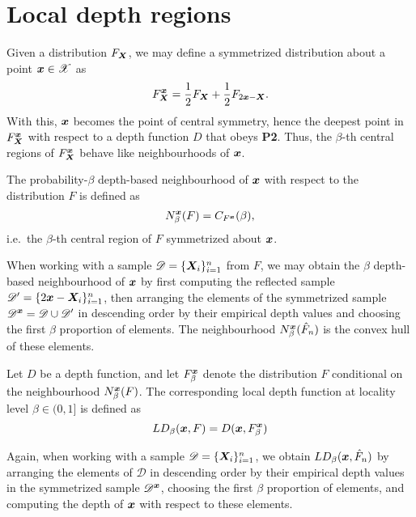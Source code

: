 

\section{Local depth regions}

Given a distribution $F_{\bm{X}}$, we may define a symmetrized distribution about
a point $\bm{x} \in \mathscr{X}$ as
\begin{equation}
    F^{\bm{x}}_{\bm{X}} = \frac{1}{2}F_{\bm{X}} + \frac{1}{2}F_{2\bm{x} - \bm{X}}. \label{eq:local_symmetrization}
\end{equation}
With this, $\bm{x}$ becomes the point of central symmetry, hence the deepest
point in $F^{\bm{x}}_{\bm{X}}$ with respect to a depth function $D$ that obeys
\textbf{P2}.
Thus, the $\beta$-th central regions of $F^{\bm{x}}_{\bm{X}}$ behave like
neighbourhoods of $\bm{x}$.

\begin{definition}
    The probability-$\beta$ depth-based neighbourhood of $\bm{x}$ with respect to
    the distribution $F$ is defined as
    \begin{equation}
        N^{\bm{x}}_\beta(F) = C_{F^{\bm{x}}}(\beta),
    \end{equation}
    i.e.\ the $\beta$-th central region of $F$ symmetrized about $\bm{x}$.
\end{definition}

When working with a sample $\mathscr{D} = \{\bm{X}_i\}_{i = 1}^n$ from $F$, we
may obtain the $\beta$ depth-based neighbourhood of $\bm{x}$ by first computing
the reflected sample $\mathscr{D}' = \{2\bm{x} - \bm{X}_i\}_{i = 1}^n$, then
arranging the elements of the symmetrized sample $\mathscr{D}^{\bm{x}} =
\mathscr{D} \cup \mathscr{D}'$ in descending order by their empirical depth
values and choosing the first $\beta$ proportion of elements.
The neighbourhood $N^{\bm{x}}_\beta(\hat{F}_n)$ is the convex hull of these
elements.


\begin{definition}
    Let $D$ be a depth function, and let $F^{\bm{x}}_\beta$ denote the
    distribution $F$ conditional on the neighbourhood $N^{\bm{x}}_\beta(F)$.
    The corresponding local depth function at locality level $\beta \in (0,
    1]$ is defined as
    \begin{equation}
        LD_\beta(\bm{x}, F) = D(\bm{x}, F^{\bm{x}}_\beta)
    \end{equation}
\end{definition}

Again, when working with a sample $\mathscr{D} = \{\bm{X}_i\}_{i = 1}^n$, we
obtain $LD_\beta(\bm{x}, \hat{F}_n)$ by arranging the elements of $\mathscr{D}$
in descending order by their empirical depth values in the symmetrized sample
$\mathscr{D}^{\bm{x}}$, choosing the first $\beta$ proportion of elements, and
computing the depth of $\bm{x}$ with respect to these elements.

